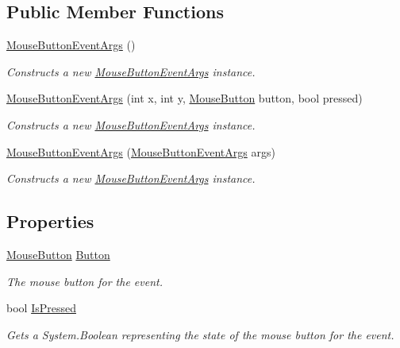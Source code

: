 \subsection*{Public Member Functions}
\begin{DoxyCompactItemize}
\item 
\hyperlink{class_open_t_k_1_1_input_1_1_mouse_button_event_args_a40c290bed10ccc076096164678606e15}{Mouse\-Button\-Event\-Args} ()
\begin{DoxyCompactList}\small\item\em Constructs a new \hyperlink{class_open_t_k_1_1_input_1_1_mouse_button_event_args}{Mouse\-Button\-Event\-Args} instance. \end{DoxyCompactList}\item 
\hyperlink{class_open_t_k_1_1_input_1_1_mouse_button_event_args_a62b851f376e86115d1f3549f4656aa9c}{Mouse\-Button\-Event\-Args} (int x, int y, \hyperlink{namespace_open_t_k_1_1_input_a2f6f4de1a952f42570d2e06fd15b5774}{Mouse\-Button} button, bool pressed)
\begin{DoxyCompactList}\small\item\em Constructs a new \hyperlink{class_open_t_k_1_1_input_1_1_mouse_button_event_args}{Mouse\-Button\-Event\-Args} instance. \end{DoxyCompactList}\item 
\hyperlink{class_open_t_k_1_1_input_1_1_mouse_button_event_args_a9129ab8d1b7194a702107db165729062}{Mouse\-Button\-Event\-Args} (\hyperlink{class_open_t_k_1_1_input_1_1_mouse_button_event_args}{Mouse\-Button\-Event\-Args} args)
\begin{DoxyCompactList}\small\item\em Constructs a new \hyperlink{class_open_t_k_1_1_input_1_1_mouse_button_event_args}{Mouse\-Button\-Event\-Args} instance. \end{DoxyCompactList}\end{DoxyCompactItemize}
\subsection*{Properties}
\begin{DoxyCompactItemize}
\item 
\hyperlink{namespace_open_t_k_1_1_input_a2f6f4de1a952f42570d2e06fd15b5774}{Mouse\-Button} \hyperlink{class_open_t_k_1_1_input_1_1_mouse_button_event_args_aeae9a397f99f0b0f6026d2f5bda7293b}{Button}
\begin{DoxyCompactList}\small\item\em The mouse button for the event. \end{DoxyCompactList}\item 
bool \hyperlink{class_open_t_k_1_1_input_1_1_mouse_button_event_args_a2c64b9baa8da00ed048ba612771a27a7}{Is\-Pressed}
\begin{DoxyCompactList}\small\item\em Gets a System.\-Boolean representing the state of the mouse button for the event. \end{DoxyCompactList}\end{DoxyCompactItemize}


